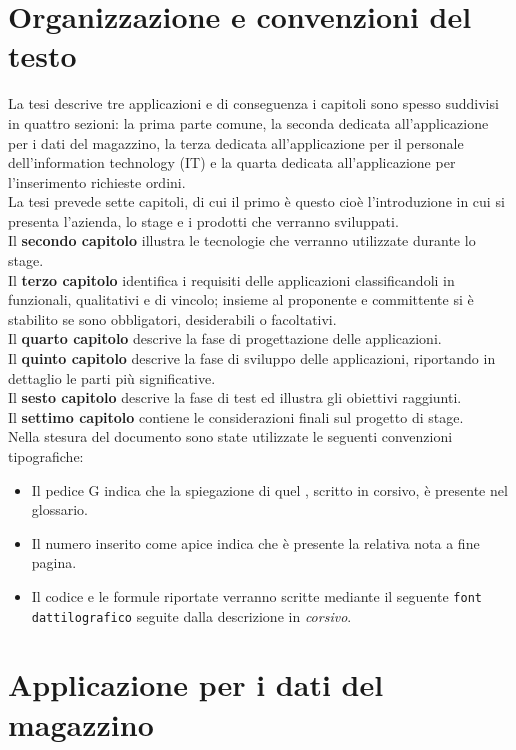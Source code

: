 \section{Organizzazione e convenzioni del testo}
La tesi descrive tre applicazioni e di conseguenza i capitoli sono spesso suddivisi in quattro sezioni:
la prima parte comune, la seconda dedicata all'applicazione per i dati del magazzino, la terza dedicata all'applicazione per il personale dell'information technology (IT) e la quarta dedicata all'applicazione per l'inserimento richieste ordini.\\
La tesi prevede sette capitoli, di cui il primo è questo cioè l'introduzione in cui si presenta l'azienda, lo stage e i prodotti che verranno sviluppati. \\
Il \textbf{secondo capitolo} illustra le tecnologie che verranno utilizzate durante lo stage.\\
Il \textbf{terzo capitolo} identifica i requisiti delle applicazioni classificandoli in funzionali, qualitativi e di vincolo; insieme al proponente e committente si è stabilito se sono obbligatori, desiderabili o facoltativi.\\
Il \textbf{quarto capitolo} descrive la fase di progettazione delle applicazioni.\\
Il \textbf{quinto capitolo} descrive la fase di sviluppo delle applicazioni, riportando in dettaglio le parti più significative.\\
Il \textbf{sesto capitolo} descrive la fase di test ed illustra gli obiettivi raggiunti.\\
Il \textbf{settimo capitolo} contiene le considerazioni finali sul progetto di stage.\\
Nella stesura del documento sono state utilizzate le seguenti convenzioni tipografiche:
\begin{itemize}
    \item Il pedice G indica che la spiegazione di quel , scritto in corsivo, è presente nel glossario.
    \item Il numero inserito come apice indica che è presente la relativa nota a fine pagina.
    \item Il codice e le formule riportate verranno scritte mediante il seguente \texttt{font dattilografico} seguite dalla descrizione in \textit{corsivo}.    
\end{itemize}

\section{Applicazione per i dati del magazzino}
